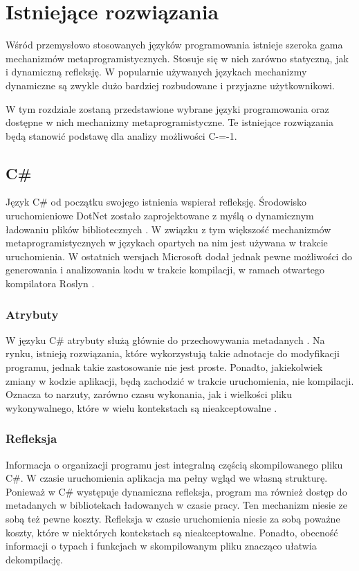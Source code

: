 \section{Istniejące rozwiązania}

Wśród przemysłowo stosowanych języków programowania istnieje szeroka gama mechanizmów metaprogramistycznych. Stosuje się w nich zarówno statyczną, jak i dynamiczną refleksję. 
W popularnie używanych językach mechanizmy dynamiczne są zwykle dużo bardziej rozbudowane i przyjazne użytkownikowi.

W tym rozdziale zostaną przedstawione wybrane języki programowania oraz dostępne w nich mechanizmy metaprogramistyczne.
Te istniejące rozwiązania będą stanowić podstawę dla analizy możliwości C-=-1.



\subsection{C\#}
Język C\# od początku swojego istnienia wspierał refleksję\cite{csharp:getType}.
Środowisko uruchomieniowe DotNet zostało zaprojektowane z myślą o dynamicznym ładowaniu plików bibliotecznych \cite{csharp:assemblies}.
W związku z tym większość mechanizmów metaprogramistycznych w językach opartych na nim jest używana w trakcie uruchomienia.
W ostatnich wersjach Microsoft dodał jednak pewne możliwości do generowania i analizowania kodu w trakcie kompilacji, w ramach otwartego kompilatora Roslyn \cite{csharp:source_generators}.

\subsubsection{Atrybuty}
W języku C\# atrybuty służą głównie do przechowywania metadanych \cite{csharp:attributes}.
Na rynku, istnieją rozwiązania, które wykorzystują takie adnotacje do modyfikacji programu, jednak takie zastosowanie nie jest proste.
Ponadto, jakiekolwiek zmiany w kodzie aplikacji, będą zachodzić w trakcie uruchomienia, nie kompilacji.
Oznacza to narzuty, zarówno czasu wykonania, jak i wielkości pliku wykonywalnego, które w wielu kontekstach są nieakceptowalne \cite{csharp:reflection_cost, cpp:reflection:high_performance}.
\subsubsection{Refleksja}

Informacja o organizacji programu jest integralną częścią skompilowanego pliku C\#.
W czasie uruchomienia aplikacja ma pełny wgląd we własną strukturę.
Ponieważ w C\# występuje dynamiczna refleksja, program ma również dostęp do metadanych w bibliotekach ładowanych w czasie pracy.
Ten mechanizm niesie ze sobą też pewne koszty.
Refleksja w czasie uruchomienia niesie za sobą poważne koszty, które w niektórych kontekstach są nieakceptowalne.
Ponadto, obecność informacji o typach i funkcjach w skompilowanym pliku znacząco ułatwia dekompilację.

